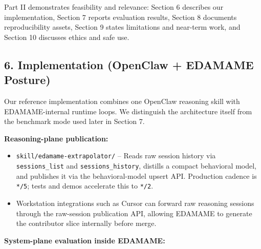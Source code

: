 \documentclass[
]{article}
\providecommand{\tightlist}{%
  \setlength{\itemsep}{0pt}\setlength{\parskip}{0pt}}
\begin{document}
Part II demonstrates feasibility and relevance: Section 6 describes our
implementation, Section 7 reports evaluation results, Section 8
documents reproducibility assets, Section 9 states limitations and
near-term work, and Section 10 discusses ethics and safe use.

\subsection{6. Implementation (OpenClaw + EDAMAME
Posture)}\label{implementation-openclaw-edamame-posture}

Our reference implementation combines one OpenClaw reasoning skill with
EDAMAME-internal runtime loops. We distinguish the architecture itself
from the benchmark mode used later in Section 7.

\textbf{Reasoning-plane publication:}

\begin{itemize}
\tightlist
\item
  \texttt{skill/edamame-extrapolator/} -- Reads raw session history via
  \texttt{sessions\_list} and \texttt{sessions\_history}, distills a
  compact behavioral model, and publishes it via the behavioral-model
  upsert API. Production cadence is \texttt{*/5}; tests and demos
  accelerate this to \texttt{*/2}.
\item
  Workstation integrations such as Cursor can forward raw reasoning
  sessions through the raw-session publication API, allowing EDAMAME to
  generate the contributor slice internally before merge.
\end{itemize}

\textbf{System-plane evaluation inside EDAMAME:}
\end{document}
